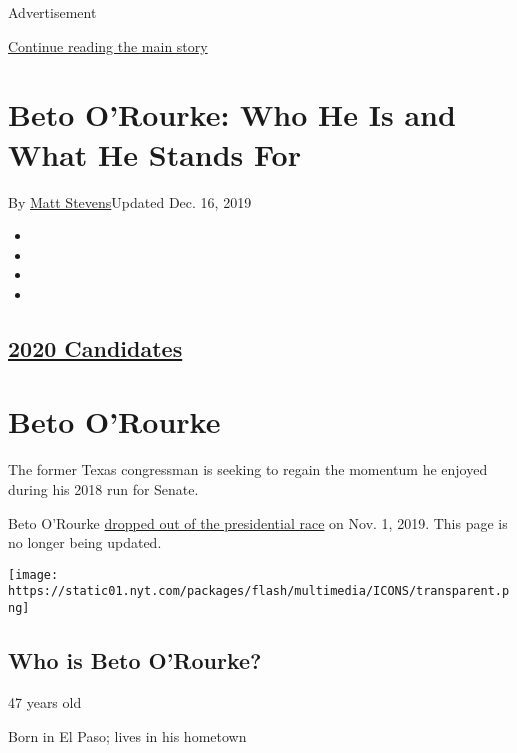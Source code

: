 Advertisement

\protect\hyperlink{after-top}{Continue reading the main story}

\hypertarget{beto-orourke-who-he-is-and-what-he-stands-for}{%
\section{Beto O'Rourke: Who He Is and What He Stands
For}\label{beto-orourke-who-he-is-and-what-he-stands-for}}

By \href{https://www.nytimes.com/by/matt-stevens}{Matt Stevens}Updated
Dec. 16, 2019

\begin{itemize}
\item
\item
\item
\item
\end{itemize}

\hypertarget{2020-candidates}{%
\subsection{\texorpdfstring{\href{https://www.nytimes.com/interactive/2019/us/politics/2020-presidential-candidates.html}{2020
Candidates}}{2020 Candidates}}\label{2020-candidates}}

\hypertarget{beto-orourke}{%
\section{Beto O'Rourke}\label{beto-orourke}}

The former Texas congressman is seeking to regain the momentum he
enjoyed during his 2018 run for Senate.

Beto O'Rourke
\href{https://www.nytimes.com/2019/11/01/us/politics/beto-orourke-drops-out.html}{dropped
out of the presidential race} on Nov. 1, 2019. This page is no longer
being updated.

\texttt{[image: https://static01.nyt.com/packages/flash/multimedia/ICONS/transparent.png]}

\hypertarget{who-is-beto-orourke}{%
\subsection{Who is Beto O'Rourke?}\label{who-is-beto-orourke}}

47 years old

Born in El Paso; lives in his hometown

